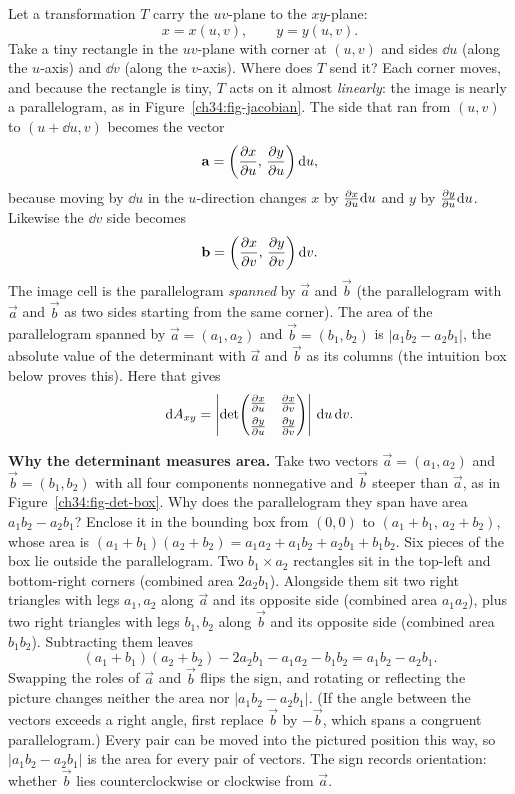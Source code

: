 Let a transformation $T$ carry the $uv$-plane to the $xy$-plane:
\[
  x=x(u,v),\qquad y=y(u,v).
\]
Take a tiny rectangle in the $uv$-plane with corner at $(u,v)$ and sides
$\dd u$ (along the $u$-axis) and $\dd v$ (along the $v$-axis). Where does $T$ send
it? Each corner moves, and because the rectangle is tiny, $T$ acts on it almost
\emph{linearly}: the image is nearly a parallelogram, as in
Figure~\ref{ch34:fig-jacobian}. The side that ran from $(u,v)$ to $(u+\dd u,v)$
becomes the vector
\[
  \mathbf{a}=\left(\frac{\partial x}{\partial u},\,\frac{\partial y}{\partial u}\right)\mathrm{d} u,
\]
because moving by $\dd u$ in the $u$-direction changes $x$ by $\frac{\partial x}{\partial u}\mathrm{d} u$
and $y$ by $\frac{\partial y}{\partial u}\mathrm{d} u$. Likewise the $\dd v$ side becomes
\[
  \mathbf{b}=\left(\frac{\partial x}{\partial v},\,\frac{\partial y}{\partial v}\right)\mathrm{d} v .
\]
The image cell is the parallelogram \emph{spanned} by $\vec a$ and $\vec b$ (the
parallelogram with $\vec a$ and $\vec b$ as two sides starting from the same
corner). The area of the parallelogram spanned by $\vec a=(a_1,a_2)$ and
$\vec b=(b_1,b_2)$ is $|a_1b_2-a_2b_1|$, the absolute value of the determinant
with $\vec a$ and $\vec b$ as its columns (the intuition box below proves this).
Here that gives
\[
  \mathrm{d} A_{xy}
  =\left|\det\!\begin{pmatrix}\frac{\partial x}{\partial u} & \frac{\partial x}{\partial v}\\[4pt]
                              \frac{\partial y}{\partial u} & \frac{\partial y}{\partial v}\end{pmatrix}\right|
  \,\mathrm{d} u\,\mathrm{d} v .
\]

\begin{intuitionbox}
\textbf{Why the determinant measures area.}
Take two vectors $\vec a = (a_1, a_2)$ and $\vec b = (b_1, b_2)$ with all four
components nonnegative and $\vec b$ steeper than $\vec a$, as in
Figure~\ref{ch34:fig-det-box}. Why does the parallelogram they span have area
$a_1 b_2 - a_2 b_1$?
Enclose it in the bounding box from $(0,0)$ to $(a_1+b_1,\,a_2+b_2)$, whose area is
$(a_1+b_1)(a_2+b_2) = a_1 a_2 + a_1 b_2 + a_2 b_1 + b_1 b_2$.
Six pieces of the box lie outside the parallelogram.
Two $b_1\times a_2$ rectangles sit in the top-left and bottom-right corners (combined area $2a_2 b_1$).
Alongside them sit two right triangles with legs $a_1, a_2$ along $\vec a$ and its opposite side (combined area $a_1 a_2$),
plus two right triangles with legs $b_1, b_2$ along $\vec b$ and its opposite side (combined area $b_1 b_2$).
Subtracting them leaves
\[
  (a_1+b_1)(a_2+b_2) - 2a_2 b_1 - a_1 a_2 - b_1 b_2 = a_1 b_2 - a_2 b_1 .
\]
Swapping the roles of $\vec a$ and $\vec b$ flips the sign, and rotating or
reflecting the picture changes neither the area nor $|a_1 b_2 - a_2 b_1|$. (If the
angle between the vectors exceeds a right angle, first replace $\vec b$ by
$-\vec b$, which spans a congruent parallelogram.) Every pair can be moved into
the pictured position this way, so $|a_1 b_2 - a_2 b_1|$ is the area for every
pair of vectors. The sign records
orientation: whether $\vec b$ lies counterclockwise or clockwise from $\vec a$.
\end{intuitionbox}

